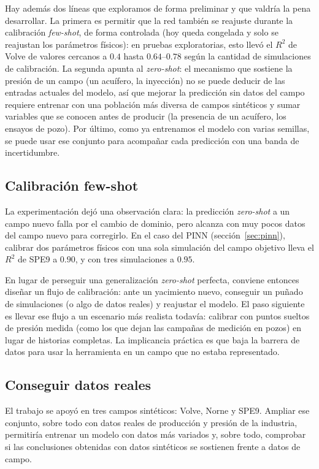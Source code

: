 \documentclass[12pt,a4paper]{article}
\begin{document}
Hay además dos líneas que exploramos de forma preliminar y que valdría la pena
desarrollar. La primera es permitir que la red también se reajuste durante la calibración
\textit{few-shot}, de forma controlada (hoy queda congelada y solo se reajustan los
parámetros físicos): en pruebas exploratorias, esto llevó el $R^2$ de Volve de valores
cercanos a $0.4$ hasta $0.64$--$0.78$ según la cantidad de simulaciones de calibración.
La segunda apunta al \textit{zero-shot}: el mecanismo que sostiene la presión de un campo
(un acuífero, la inyección) no se puede deducir de las entradas actuales del modelo, así
que mejorar la predicción sin datos del campo requiere entrenar con una población más
diversa de campos sintéticos y sumar variables que se conocen antes de producir (la
presencia de un acuífero, los ensayos de pozo). Por último, como ya entrenamos el modelo
con varias semillas, se puede usar ese conjunto para acompañar cada predicción con una
banda de incertidumbre.

\subsection{Calibración few-shot}

La experimentación dejó una observación clara: la predicción \textit{zero-shot} a un campo
nuevo falla por el cambio de dominio, pero alcanza con muy pocos datos del campo nuevo
para corregirlo. En el caso del PINN (sección~\ref{sec:pinn}), calibrar dos parámetros
físicos con una sola simulación del campo objetivo lleva el $R^2$ de SPE9 a $0.90$, y con
tres simulaciones a $0.95$.

En lugar de perseguir una generalización \textit{zero-shot} perfecta, conviene entonces
diseñar un flujo de calibración: ante un yacimiento nuevo, conseguir un puñado de
simulaciones (o algo de datos reales) y reajustar el modelo. El paso siguiente es llevar
ese flujo a un escenario más realista todavía: calibrar con puntos sueltos de presión
medida (como los que dejan las campañas de medición en pozos) en lugar de historias
completas. La implicancia práctica es que baja la barrera de datos para usar la
herramienta en un campo que no estaba representado.

\subsection{Conseguir datos reales}

El trabajo se apoyó en tres campos sintéticos: Volve, Norne y SPE9. Ampliar ese conjunto,
sobre todo con datos reales de producción y presión de la industria, permitiría
entrenar un modelo con datos más variados y, sobre todo, comprobar si las conclusiones
obtenidas con datos sintéticos se sostienen frente a datos de campo.
\end{document}
